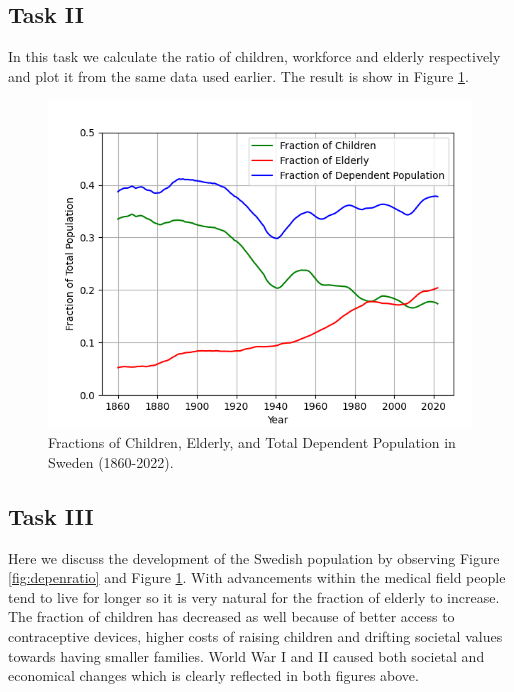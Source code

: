\documentclass[a4paper]{article}
\begin{document}
\subsection*{Task II}
In this task we calculate the ratio of children, workforce and elderly respectively and plot it from the same data used earlier.
The result is show in Figure \ref{fig:frac}.



\begin{figure}[H]
  \begin{center}
    \includegraphics[scale=0.5]{frac.png}
    \caption{Fractions of Children, Elderly, and Total Dependent Population  in Sweden (1860-2022).}
    \label{fig:frac}
  \end{center}
\end{figure}

\subsection*{Task III}
Here we discuss the development of the Swedish population by observing Figure \ref{fig:depenratio} and Figure \ref{fig:frac}.
With advancements within the medical field people tend to live for longer so it is very natural for the fraction of elderly to increase. The fraction of children has decreased as well because of better access to contraceptive devices, higher costs of raising children and drifting societal values towards having smaller families. World War I and II caused both societal and economical changes which is clearly reflected in both figures above.\\
\end{document}
